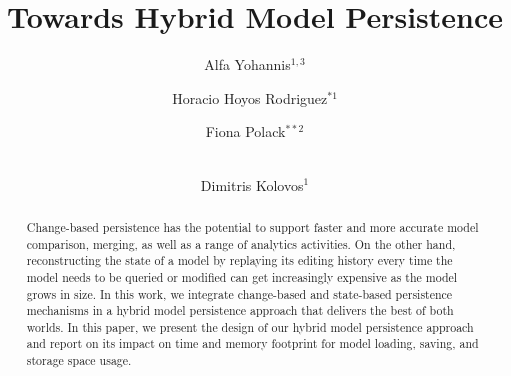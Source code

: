 \documentclass{llncs}
\begin{document}
\renewcommand{\thelstlisting}{\arabic{lstlisting}}
\renewcommand{\labelitemi}{$\bullet$}
\newcommand{\dk}[1]{\textbf{[DK: #1]}}

\title{Towards Hybrid Model Persistence}
%
%
\author{
Alfa Yohannis$^{1,3}$ \and Horacio Hoyos Rodriguez$^{*1}$ \and Fiona Polack$^{**2}$ \and \\ Dimitris Kolovos$^{1}$
}
%
%


\maketitle      %
\begin{abstract}
Change-based persistence has the potential to support faster and more accurate model comparison, merging, as well as a range of analytics activities. On the other hand, reconstructing the state of a model by replaying its editing history every time the model needs to be queried or modified can get increasingly expensive as the model grows in size. In this work, we integrate change-based and state-based persistence mechanisms in a hybrid model persistence approach that delivers the best of both worlds. In this paper, we present the design of our hybrid model persistence approach and report on its impact on time and memory footprint for model loading, saving, and storage space usage.
\end{abstract}
\end{document}
